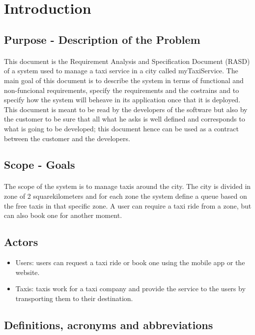 \section{Introduction}
	\subsection{Purpose - Description of the Problem}
	\paragraph*{}This document is the Requirement Analysis and Specification Document (RASD) of a system used to manage a taxi service in a city called myTaxiService. The main goal of this document is to describe the system in terms of functional and non-funcional requirements, specify the requirements and the costrains and to specify how the system will beheave in its application once that it is deployed. This document is meant to be read by the developers of the software but also by the customer to be sure that all what he asks is well defined and corresponds to what is going to be developed; this document hence can be used as a contract between the customer and the developers.
		
	\subsection{Scope - Goals}
	\paragraph*{}The scope of the system is to manage taxis around the city. The city is divided in zone of 2 squarekilometers and for each zone the system define a queue based on the free taxis in that specific zone. A user can require a taxi ride from a zone, but can also book one for another moment.
	
	\subsection{Actors}
	\begin{itemize}
		\item Users: users can request a taxi ride or book one using the mobile app or the website.
		\item Taxis: taxis work for a taxi company and provide the service to the users by transporting them to their destination.
	\end{itemize}
	\subsection{Definitions, acronyms and abbreviations}
